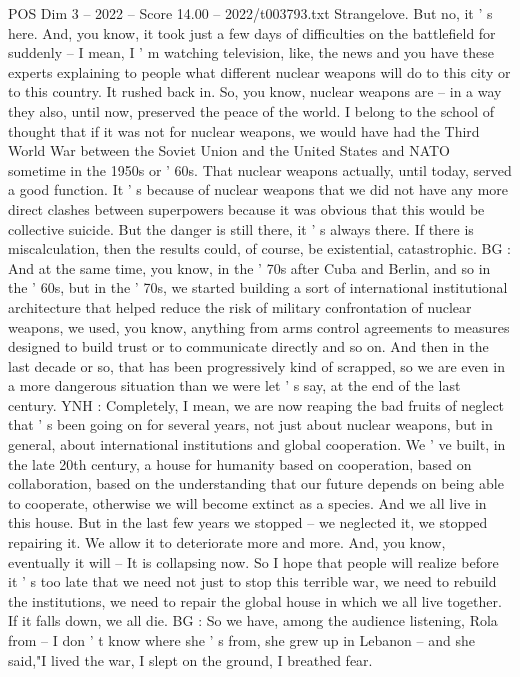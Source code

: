 \begin{textsample}{POS Dim 3 – 2022 – Score 14.00 – 2022/t003793.txt}
Strangelove.
But no, it ' s here.
And, you know, it took just a few days of difficulties on the battlefield for suddenly -- I mean, I ' m watching television, like, the news and you have these experts explaining to people what different nuclear weapons will do to this city or to this country.
It rushed back in.
So, you know, nuclear weapons are -- in a way they also, until now, preserved the peace of the world.
I belong to the school of thought that if it was not for nuclear weapons, we would have had the Third World War between the Soviet Union and the United States and NATO sometime in the 1950s or ' 60s.
That nuclear weapons actually, until today, served a good function.
It ' s because of nuclear weapons that we did not have any more direct clashes between superpowers because it was obvious that this would be collective suicide.
But the danger is still there, it ' s always there.
If there is miscalculation, then the results could, of course, be existential, catastrophic.
BG : And at the same time, you know, in the ' 70s after Cuba and Berlin, and so in the ' 60s, but in the ' 70s, we started building a sort of international institutional architecture that helped reduce the risk of military confrontation of nuclear weapons, we used, you know, anything from arms control agreements to measures designed to build trust or to communicate directly and so on.
And then in the last decade or so, that has been progressively kind of scrapped, so we are even in a more dangerous situation than we were let ' s say, at the end of the last century.
YNH : Completely, I mean, we are now reaping the bad fruits of neglect that ' s been going on for several years, not just about nuclear weapons, but in general, about international institutions and global cooperation.
We ' ve built, in the late 20th century, a house for humanity based on cooperation, based on collaboration, based on the understanding that our future depends on being able to cooperate, otherwise we will become extinct as a species.
And we all live in this house.
But in the last few years we stopped -- we neglected it, we stopped repairing it.
We allow it to deteriorate more and more.
And, you know, eventually it will -- It is collapsing now.
So I hope that people will realize before it ' s too late that we need not just to stop this terrible war, we need to rebuild the institutions, we need to repair the global house in which we all live together.
If it falls down, we all die.
BG : So we have, among the audience listening, Rola from -- I don ' t know where she ' s from, she grew up in Lebanon -- and she said,"I lived the war, I slept on the ground, I breathed fear.

\end{textsample}
